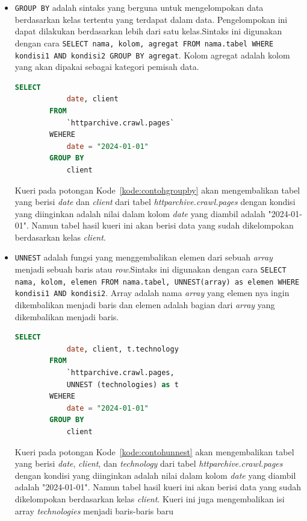 \begin{itemize}
    \item \verb|GROUP BY| adalah sintaks yang berguna untuk mengelompokan data berdasarkan kelas tertentu yang terdapat dalam data. Pengelompokan ini dapat dilakukan berdasarkan lebih dari satu kelas.Sintaks ini digunakan dengan cara \verb|SELECT nama, kolom, agregat FROM nama.tabel WHERE kondisi1 AND kondisi2 GROUP BY agregat|. Kolom agregat adalah kolom yang akan dipakai sebagai kategori pemisah data.
        \begin{lstlisting}[language=SQL, caption=contoh penggunaan sintaks \lstinline|GROUP BY|, label=kode:contohgroupby]
        SELECT
            date, client
        FROM
            `httparchive.crawl.pages`
        WEHERE
            date = "2024-01-01"
        GROUP BY
            client
    \end{lstlisting}
     Kueri pada potongan Kode~\ref{kode:contohgroupby} akan mengembalikan tabel yang berisi \textit{date} dan \textit{client} dari tabel \textit{httparchive.crawl.pages} dengan kondisi yang diinginkan adalah nilai dalam kolom \textit{date} yang diambil adalah "2024-01-01". Namun tabel hasil kueri ini akan berisi data yang sudah dikelompokan berdasarkan kelas \textit{client}.
     
    \item \verb|UNNEST| adalah fungsi yang menggembalikan elemen dari sebuah \textit{array} menjadi sebuah baris atau \textit{row}.Sintaks ini digunakan dengan cara \verb|SELECT nama, kolom, elemen FROM nama.tabel, UNNEST(array) as elemen WHERE kondisi1 AND kondisi2|. Array adalah nama \textit{array} yang elemen nya ingin dikembalikan menjadi baris dan elemen adalah bagian dari \textit{array} yang dikembalikan menjadi baris.
      \begin{lstlisting}[language=SQL, caption=contoh penggunaan sintaks \lstinline|UNNEST|, label=kode:contohunnest]
        SELECT
            date, client, t.technology
        FROM
            `httparchive.crawl.pages,
            UNNEST (technologies) as t
        WEHERE
            date = "2024-01-01"
        GROUP BY
            client
    \end{lstlisting}
     Kueri pada potongan Kode~\ref{kode:contohunnest} akan mengembalikan tabel yang berisi \textit{date}, \textit{client}, dan \textit{technology} dari tabel \textit{httparchive.crawl.pages} dengan kondisi yang diinginkan adalah nilai dalam kolom \textit{date} yang diambil adalah "2024-01-01". Namun tabel hasil kueri ini akan berisi data yang sudah dikelompokan berdasarkan kelas \textit{client}. Kueri ini juga mengembalikan isi array \textit{technologies} menjadi baris-baris baru
     

\end{itemize}
